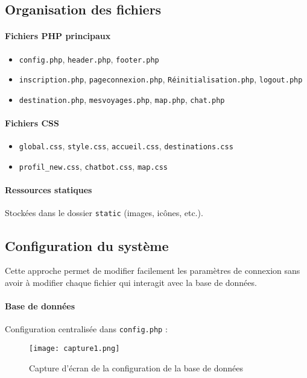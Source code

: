 \documentclass[a4paper,12pt]{article}
\begin{document}
\subsection{Organisation des fichiers}

\paragraph{Fichiers PHP principaux}
\begin{itemize}
    \item \texttt{config.php}, \texttt{header.php}, \texttt{footer.php}
    \item \texttt{inscription.php}, \texttt{pageconnexion.php}, \texttt{Réinitialisation.php}, \texttt{logout.php}
    \item \texttt{destination.php}, \texttt{mesvoyages.php}, \texttt{map.php}, \texttt{chat.php}
\end{itemize}

\paragraph{Fichiers CSS}
\begin{itemize}
    \item \texttt{global.css}, \texttt{style.css}, \texttt{accueil.css}, \texttt{destinations.css}
    \item \texttt{profil\_new.css}, \texttt{chatbot.css}, \texttt{map.css}
\end{itemize}

\paragraph{Ressources statiques}
Stockées dans le dossier \texttt{static} (images, icônes, etc.).

\subsection{Configuration du système}
Cette approche permet de modifier facilement les paramètres de connexion sans avoir à
modifier chaque fichier qui interagit avec la base de données.
\paragraph{Base de données}
Configuration centralisée dans \texttt{config.php} :
\begin{figure}[H]
    \centering
    \texttt{[image: capture1.png]}
    \caption{Capture d’écran de la configuration de la base de données}
\end{figure}
\end{document}
